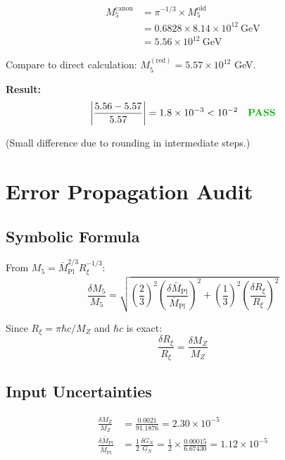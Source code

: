 \documentclass[11pt,a4paper]{article}
\newcommand{\Rxi}{R_\xi}
\newcommand{\Mplbar}{\bar{M}_{\mathrm{Pl}}}
\newcommand{\Mfive}{M_5}
\newcommand{\GN}{G_N}
\newcommand{\MZ}{M_Z}
\newcommand{\hbarc}{\hbar c}
\newcommand{\PASS}{\textcolor{green!70!black}{\textbf{PASS}}}
\begin{document}
\begin{align}
\Mfive^{\mathrm{canon}} &= \pi^{-1/3} \times \Mfive^{\mathrm{old}}
\label{eq:M5-canon-from-old}\\
&= 0.6828 \times 8.14 \times 10^{12}~\mathrm{GeV} \label{eq:M5-canon-step}\\
&= 5.56 \times 10^{12}~\mathrm{GeV} \label{eq:M5-canon-mapped}
\end{align}

Compare to direct calculation: $\Mfive^{\mathrm{(red)}} = 5.57 \times 10^{12}$ GeV.

\textbf{Result:}
\begin{equation}
\left| \frac{5.56 - 5.57}{5.57} \right| = 1.8 \times 10^{-3} < 10^{-2} \quad \PASS
\label{eq:M5-map-pass}
\end{equation}

(Small difference due to rounding in intermediate steps.)

\section{Error Propagation Audit}

\subsection{Symbolic Formula}

From $\Mfive = \Mplbar^{2/3} \Rxi^{-1/3}$:
\begin{equation}
\frac{\delta\Mfive}{\Mfive} = \sqrt{\left(\frac{2}{3}\right)^2
\left(\frac{\delta\Mplbar}{\Mplbar}\right)^2 + \left(\frac{1}{3}\right)^2
\left(\frac{\delta\Rxi}{\Rxi}\right)^2}
\label{eq:error-formula}
\end{equation}

Since $\Rxi = \pi\hbarc/\MZ$ and $\hbarc$ is exact:
\begin{equation}
\frac{\delta\Rxi}{\Rxi} = \frac{\delta\MZ}{\MZ}
\label{eq:error-Rxi}
\end{equation}

\subsection{Input Uncertainties}

\begin{align}
\frac{\delta\MZ}{\MZ} &= \frac{0.0021}{91.1876} = 2.30 \times 10^{-5}
\label{eq:delta-MZ}\\
\frac{\delta\Mplbar}{\Mplbar} &= \frac{1}{2}\frac{\delta\GN}{\GN}
= \frac{1}{2} \times \frac{0.00015}{6.67430} = 1.12 \times 10^{-5}
\label{eq:delta-Mplbar}
\end{align}
\end{document}
